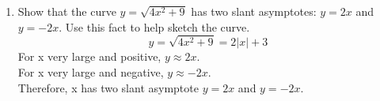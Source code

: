\documentclass[12pt]{article}
\begin{document}
\begin{enumerate}
\begin{enumerate}
\begin{figure}[!h]
\begin{framed}
                        \end{framed}
                    \end{figure}
                \end{enumerate}
                \setcounter{enumi}{58}
                \item 
                Show that the curve $y = \sqrt{4x^2 + 9}$ has two slant asymptotes: $y = 2x$ and $y = -2x$. Use this fact to help sketch the curve.
                \[y = \sqrt{4x^2 + 9} = 2|x| + 3\]
                For x very large and positive, $y \approx 2x$.\\
                For x very large and negative, $y \approx -2x$.\\
                Therefore, x has two slant asymptote $y = 2x$ and $y = -2x$.
                \begin{figure}[!h]
                    \centering
                    \begin{framed}
                    \end{framed}
                \end{figure}

\end{enumerate}
\end{document}

